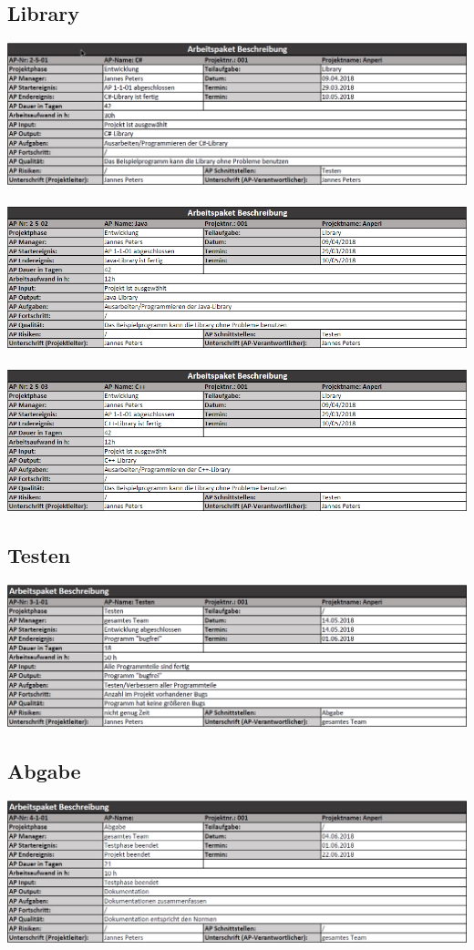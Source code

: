 \documentclass{scrartcl}
\begin{document}
\subsection{Library}
\includegraphics[scale=0.6]{ArbeitsPakete/AP2-5-01.png}
\\
\\
\includegraphics[scale=0.672]{ArbeitsPakete/AP2-5-02.png}
\\
\\
\includegraphics[scale=0.672]{ArbeitsPakete/AP2-5-03.png}
\subsection{Testen}
\includegraphics[scale=0.6]{ArbeitsPakete/AP3-1-01.png}
\subsection{Abgabe}
\includegraphics[scale=0.6]{ArbeitsPakete/AP4-1-01.png}
\end{document}
